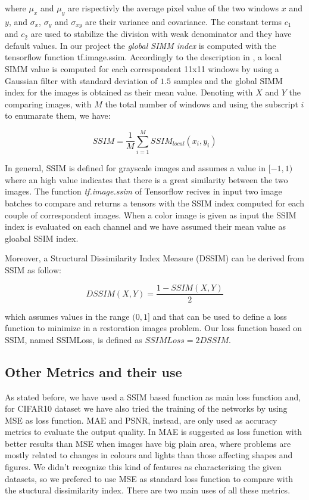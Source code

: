 \documentclass[12pt,a4paper]{report}
\begin{document}
where $\mu_x$ and $\mu_y$ are rispectivly the average pixel value of the two windows $x$ and $y$, and $\sigma_x$, $\sigma_y$ and $\sigma_{xy}$ are their variance and covariance. The constant terms $c_1$ and $c_2$ are used to stabilize the division with weak denominator and they have default values. In our project the \textit{global SIMM index} is computed with the tensorflow function tf.image.ssim. Accordingly to the description in \cite{W&B}, a local SIMM value is computed for each correspondent 11x11 windows by using a Gaussian filter with standard deviation of $1.5$ samples and the global SIMM index for the images is obtained as their mean value. Denoting with $X$ and $Y$ the comparing images, with $M$ the total number of windows and using the subscript $i$ to enumarate them, we have:

\begin{equation}
SSIM = \frac{1}{M}\sum_{i=1}^M SSIM_{local}(x_i,y_i)
\end{equation}

In general, SSIM is defined for grayscale images and assumes a value in $[-1,1)$ where an high value indicates that there is a great similarity between the two images. The function \emph{tf.image.ssim} of Tensorflow recives in input two image batches to compare and returns a tensors with the SSIM index computed for each couple of correspondent images. When a color image is given as input the SSIM index is evaluated on each channel and we have assumed their mean value as gloabal SSIM index.

Moreover, a Structural Dissimilarity Index Measure (DSSIM) can be derived from SSIM as follow:

\begin{equation}
DSSIM(X,Y) = \frac{1-SSIM(X,Y)}{2}
\end{equation} 

which assumes values in the range $(0,1]$ and that can be used to define a loss function to minimize in a restoration images problem. Our loss function based on SSIM, named SSIMLoss, is defined as $SSIMLoss = 2 DSSIM$.



\subsection{Other Metrics and their use}
As stated before, we have used a SSIM based function as main loss function and, for CIFAR10 dataset we have also tried the training of the networks by using MSE as loss function. MAE and PSNR, instead, are only used as accuracy metrics to evaluate the output quality. In \cite{Z&G&F} MAE is suggested as loss function with better results than MSE when images have big plain area, where problems are mostly related to changes in colours and lights than those affecting shapes and figures. We didn't recognize this kind of features as characterizing the given datasets, so we prefered to use MSE as standard loss function to compare with the stuctural dissimilarity index. There are two main uses of all these metrics.
\end{document}
